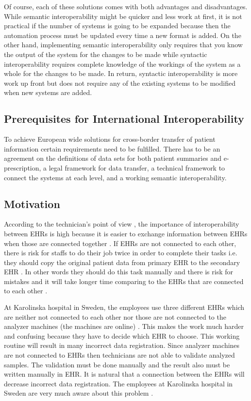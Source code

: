 \documentclass[14pt]{article}
\begin{document}
Of course, each of these solutions comes with both advantages and disadvantages.  While semantic interoperability might be quicker and less work at first, it is not practical if the number of systems is going to be expanded because then the automation process must be updated every time a new format is added.  On the other hand, implementing semantic interoperability only requires that you know the output of the system for the changes to be made while syntactic interoperability requires complete knowledge of the workings of the system as a whole for the changes to be made.  In return, syntactic interoperability is more work up front but does not require any of the existing systems to be modified when new systems are added.

\subsection{Prerequisites for International Interoperability}
\label{sec:resultsPrereq}

To achieve European wide solutions for cross-border transfer of patient information certain requirements need to be fulfilled. There has to be an agreement on the definitions of data sets for both patient summaries and e-prescription, a legal framework for data transfer, a technical framework to connect the systems at each level, and a working semantic \gls{interoperability}. \cite{epSOS1}
\label{sec:interopPrereq}

\subsection{Motivation}
\label{sec:techMotiv}
According to the technician's point of view \cite{FarzinYazdi}, the importance of interoperability between \glspl{EHR} is high because it is easier to exchange information between \glspl{EHR} when those are connected together \cite{FarzinYazdi}. If \glspl{EHR} are not connected to each other, there is risk for staffs to do their job twice in order to complete their tasks i.e. they should copy the original patient data from primary \gls{EHR} to the secondary \gls{EHR} \cite{FarzinYazdi}. In other words they should do this task manually and there is risk for mistakes and it will take longer time comparing to the \glspl{EHR} that are connected to each other \cite{FarzinYazdi}.

At Karolinska hospital in Sweden, the employees use three different \glspl{EHR} which are neither not connected to each other nor those are not connected to the analyzer machines (the machines are online) \cite{FarzinYazdi}. This makes the work much harder and confusing because they have to decide which \gls{EHR} to choose. This working routine will result in many incorrect data registration. Since analyzer machines are not connected to \glspl{EHR} then technicians are not able to validate analyzed samples. The validation must be done manually and the result also must be written manually in \gls{EHR}\cite{FarzinYazdi}.  It is natural that a connection between the \glspl{EHR} will decrease incorrect data registration. The employees at Karolinska hospital in Sweden are very much aware about this problem \cite{FarzinYazdi}.
\end{document}
